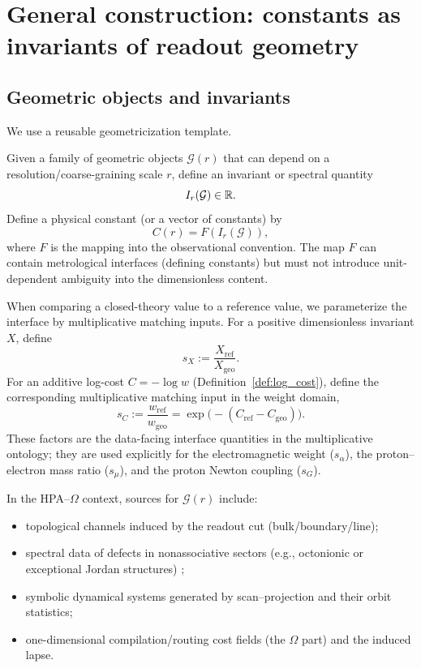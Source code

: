 \section{General construction: constants as invariants of readout geometry}
\label{sec:general_construction}

\subsection{Geometric objects and invariants}
We use a reusable geometricization template.

\begin{definition}
\label{def:geom_template}
Given a family of geometric objects $\mathcal{G}(r)$ that can depend on a resolution/coarse-graining scale $r$, define an invariant or spectral quantity
\begin{equation}
I_r(\mathcal{G})\in\mathbb{R}.
\end{equation}
Define a physical constant (or a vector of constants) by
\begin{equation}
C(r)=F\!\left(I_r(\mathcal{G})\right),
\end{equation}
where $F$ is the mapping into the observational convention. The map $F$ can contain metrological interfaces (defining constants) but must not introduce unit-dependent ambiguity into the dimensionless content.
\end{definition}

\begin{remark}
When comparing a closed-theory value to a reference value, we parameterize the interface by multiplicative matching inputs. For a positive dimensionless invariant $X$, define
\[
s_X:=\frac{X_{\mathrm{ref}}}{X_{\mathrm{geo}}}.
\]
For an additive log-cost $C=-\log w$ (Definition~\ref{def:log_cost}), define the corresponding multiplicative matching input in the weight domain,
\[
s_C:=\frac{w_{\mathrm{ref}}}{w_{\mathrm{geo}}}=\exp\!\big(-(C_{\mathrm{ref}}-C_{\mathrm{geo}})\big).
\]
These factors are the data-facing interface quantities in the multiplicative ontology; they are used explicitly for the electromagnetic weight ($s_\alpha$), the proton--electron mass ratio ($s_\mu$), and the proton Newton coupling ($s_G$).
\end{remark}

In the HPA--$\Omega$ context, sources for $\mathcal{G}(r)$ include:
\begin{itemize}
    \item topological channels induced by the readout cut (bulk/boundary/line);
    \item spectral data of defects in nonassociative sectors (e.g., octonionic or exceptional Jordan structures) \cite{Baez2002Octonions,Okubo1995Nonassociative,Schafer1966Nonassociative};
    \item symbolic dynamical systems generated by scan--projection and their orbit statistics;
    \item one-dimensional compilation/routing cost fields (the $\Omega$ part) and the induced lapse.
\end{itemize}

